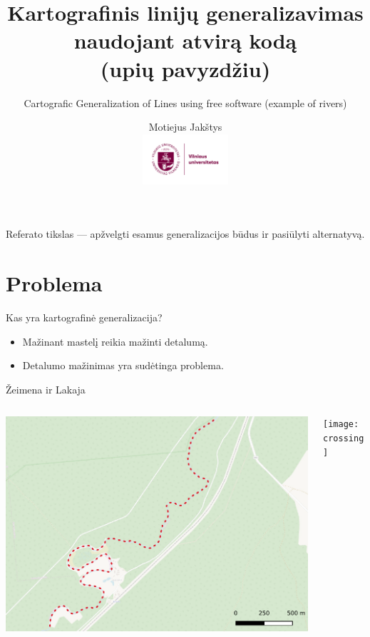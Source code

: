 \documentclass[14pt]{beamer}
\title{
    Kartografinis linijų generalizavimas naudojant atvirą kodą \\
    (upių pavyzdžiu)
}
\subtitle{
    \vspace{2em}
    Cartografic Generalization of Lines using free software (example of rivers)
}
\author{Motiejus Jakštys \\
    \includegraphics[height=5em]{../../misc/Logo_vilniaus_universitetas}
}
\newcommand{\twocols}[2]
{
    \begin{columns}[c]
        \begin{column}{0.5\textwidth}
            #1
        \end{column}
        \hspace{0pt} \vrule{}
        \begin{column}{0.5\textwidth}
            #2
        \end{column}
    \end{columns}
}
\begin{document}

\begin{frame}
\titlepage
\end{frame}

\begin{frame}
    Referato tikslas --- apžvelgti esamus generalizacijos būdus ir pasiūlyti
      alternatyvą.
\end{frame}

\section{Problema}

\begin{frame}{Kas yra kartografinė generalizacija?}
    \begin{itemize}[<+->]
        \item Mažinant mastelį reikia mažinti detalumą.
        \item Detalumo mažinimas yra sudėtinga problema.
    \end{itemize}
\end{frame}

\begin{frame}{Žeimena ir Lakaja}
    \twocols
    {\includegraphics[width=\textwidth]{zeimena}}
    {\texttt{[image: crossing]}}
\end{frame}
\end{document}
